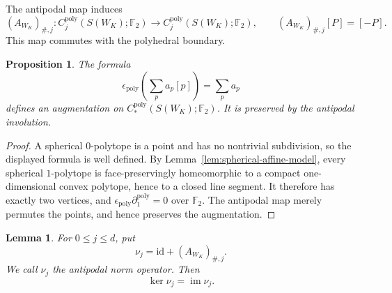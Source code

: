 \documentclass[reqno,12pt]{amsart}
\newtheorem{lemma}[theorem]{Lemma}
\newtheorem{proposition}[theorem]{Proposition}
\theoremstyle{definition}
\newcommand{\F}{\mathbb F_2}
\newcommand{\id}{\mathrm{id}}
\begin{document}
The antipodal map induces
\[
 (A_{W_K})_{\#,j}:
 C_j^{\mathrm{poly}}(S(W_K);\F)
 \longrightarrow C_j^{\mathrm{poly}}(S(W_K);\F),
 \qquad
 (A_{W_K})_{\#,j}[P]=[-P].
\]
This map commutes with the polyhedral boundary.

\begin{proposition}\label{prop:polyhedral-augmentation}
The formula
\[
 \epsilon_{\mathrm{poly}}\!
 \left(\sum_p a_p[p]\right)=\sum_p a_p
\]
defines an augmentation on
\(C_*^{\mathrm{poly}}(S(W_K);\F)\).  It is preserved by the antipodal
involution.
\end{proposition}

\begin{proof}
A spherical \(0\)-polytope is a point and has no nontrivial
subdivision, so the displayed formula is well defined.  By
Lemma~\ref{lem:spherical-affine-model}, every spherical
\(1\)-polytope is face-preservingly homeomorphic to a compact
one-dimensional convex polytope, hence to a closed line segment.  It
therefore has exactly two vertices, and
\(\epsilon_{\mathrm{poly}}\partial_1^{\mathrm{poly}}=0\) over \(\F\).
The antipodal map merely permutes the points, and hence preserves the
augmentation.
\end{proof}

\begin{lemma}\label{lem:polyhedral-antipodal-exactness}
For \(0\leq j\leq d\), put
\[
 \nu_j=\id+(A_{W_K})_{\#,j}.
\]
We call \(\nu_j\) the antipodal norm operator.  Then
\[
 \ker\nu_j=\operatorname{im}\nu_j.
\]
\end{lemma}
\end{document}

